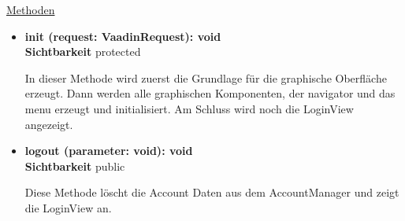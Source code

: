 \underline{Methoden}
\begin{itemize}
\itemsep0pt
\item \textbf{init (request: VaadinRequest): void}\hfill\\
\textbf{Sichtbarkeit} protected

In dieser Methode wird zuerst die Grundlage für die graphische Oberfläche erzeugt. Dann werden alle graphischen Komponenten, der navigator und das menu erzeugt und initialisiert. Am Schluss wird noch die LoginView angezeigt.

\item \textbf{logout (parameter: void): void}\hfill\\
\textbf{Sichtbarkeit} public

Diese Methode löscht die Account Daten aus dem AccountManager und zeigt die LoginView an.

\end{itemize}